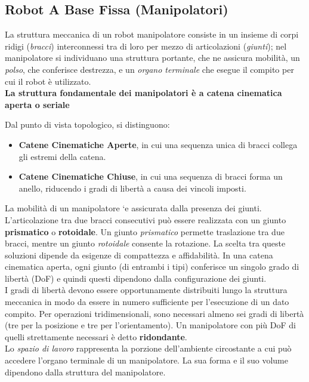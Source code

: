 ﻿\documentclass[11pt, a4paper]{article}
\begin{document}
\subsection{Robot A Base Fissa (Manipolatori)}
La struttura meccanica di un robot manipolatore consiste in un insieme di corpi ridigi (\textit{bracci}) interconnessi tra di loro per mezzo di articolazioni (\textit{giunti}); nel manipolatore si individuano una struttura portante, che ne assicura mobilità, un
\textit{polso}, che conferisce destrezza, e un \textit{organo terminale} che esegue il compito per cui il robot è utilizzato.\\
\textbf{La struttura fondamentale dei manipolatori è a catena cinematica aperta o seriale}

Dal punto di vista topologico, si distinguono:
\begin{itemize}
	\item \textbf{Catene Cinematiche Aperte}, in cui una sequenza unica di bracci collega gli estremi della catena.
	\item \textbf{Catene Cinematiche Chiuse}, in cui una sequenza di bracci forma un anello, riducendo i gradi di libertà a causa dei vincoli imposti.
\end{itemize}
La mobilità di un manipolatore `e assicurata dalla presenza dei giunti. L'articolazione tra due bracci consecutivi può essere realizzata con un giunto \textbf{prismatico} o \textbf{rotoidale}. Un giunto \textit{prismatico} permette traslazione tra due bracci, mentre un giunto \textit{rotoidale} consente la rotazione. La scelta tra queste soluzioni dipende da esigenze di compattezza e affidabilità.
In una catena cinematica aperta, ogni giunto (di entrambi i tipi) conferisce un singolo grado di libertà (DoF) e quindi questi dipendono dalla configurazione dei giunti.\\
I gradi di libertà devono essere opportunamente distribuiti lungo la struttura
meccanica in modo da essere in numero sufficiente per l'esecuzione di un dato
compito. Per operazioni tridimensionali, sono necessari almeno sei gradi di libertà (tre per la posizione e tre per l'orientamento). Un manipolatore con più DoF di quelli strettamente necessari è detto \textbf{ridondante}.\\
Lo \textit{spazio di lavoro} rappresenta la porzione dell'ambiente circostante a cui
può accedere l'organo terminale di un manipolatore. La sua forma e il suo volume
dipendono dalla struttura del manipolatore.
\newpage
\end{document}
